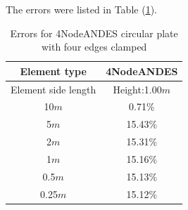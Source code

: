 \documentclass[fleqn,11pt,letter]{article}
\begin{document}
The errors were listed in Table (\ref{table errors for 4NodeANDES circular plate with four edges clamped}).

\begin{table}[H]
  \centering
      \caption{Errors for 4NodeANDES circular plate with four edges clamped}
  \label{table errors for 4NodeANDES circular plate with four edges clamped}
\begin{tabular}{|c|c|}
\hline
Element type     & 4NodeANDES          \\ \hline
Element side length & Height:1.00$m$   \\ \hline
10$m$            & 0.71\%         \\ \hline
5$m$             & 15.43\%        \\ \hline
2$m$             & 15.31\%        \\ \hline
1$m$             & 15.16\%        \\ \hline
0.5$m$           & 15.13\%        \\ \hline
0.25$m$          & 15.12\%       \\
\hline
\end{tabular}
\end{table}

\end{document}
